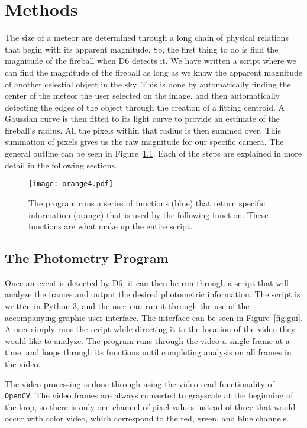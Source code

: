 \chapter{Methods}

The size of a meteor are determined through a long chain of physical relations that begin with its apparent magnitude. So, the first thing to do is find the magnitude of the fireball when D6 detects it. We have written a script where we can find the magnitude of the fireball as long as we know the apparent magnitude of another celestial object in the sky. This is done by automatically finding the center of the meteor the user selected on the image, and then automatically detecting the edges of the  object through the creation of a fitting centroid. A Gaussian curve is then fitted to its light curve to provide an estimate of the fireball's radius. All the pixels within that radius is then summed over. This summation of pixels gives us the raw magnitude for our specific camera. The general outline can be seen in Figure~\ref{fig:flowchart}. Each of the steps are explained in more detail in the following sections.

\begin{figure}[htpb]
	\centering
	\texttt{[image: orange4.pdf]}
	\caption{The program runs a series of functions (blue) that return specific information (orange) that is used by the following function. These functions are what make up the entire script.}
	\label{fig:flowchart}
\end{figure}

\section{The Photometry Program}

Once an event is detected by D6, it can then be run through a script that will analyze the frames and output the desired photometric information. The script is written in Python 3, and the user can run it through the use of the accompanying graphic user interface. The interface can be seen in Figure~\ref{fig:gui}. A user simply runs the script while directing it to the location of the video they would like to analyze. The program runs through the video a single frame at a time, and loops through its functions until completing analysis on all frames in the video.

The video processing is done through using the video read functionality of \texttt{OpenCV}. The video frames are always converted to grayscale at the beginning of the loop, so there is only one channel of pixel values instead of three that would occur with color video, which correspond to the red, green, and blue channels.

